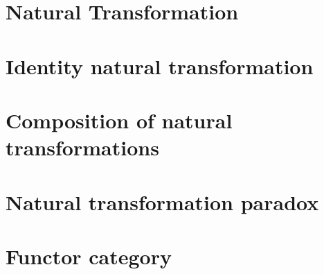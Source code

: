 \section{Natural Transformation}
    
\section{Identity natural transformation}
    
\section{Composition of natural transformations}
    
\section{Natural transformation paradox}
    
\section{Functor category}
    
